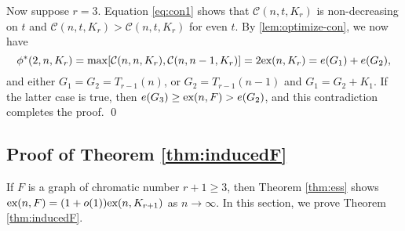 \documentclass[12pt]{article}
\newcommand*{\ex}{\textnormal{ex}}
\newcommand*{\con}{\mathcal{C}}
\begin{document}
  Now suppose $r = 3$. Equation \eqref{eq:con1} shows that $\con(n, t, K_r)$ is non-decreasing on $t$ and $\con(n, t, K_r) > \con(n, t, K_r)$ for even $t$. By \cref{lem:optimize-con}, we now have 
  \[
    \phi^*(2, n, K_r) = \max[\con(n, n, K_r), \con(n, n - 1, K_r)] = 2\ex(n, K_r) = e(G_1) + e(G_2),
  \]
  and either $G_1 = G_2 = T_{r - 1}(n)$, or $G_2 = T_{r - 1}(n - 1)$ and $G_1 = G_2 + K_1$. If the latter case is true, then $e(G_3) \geq \ex(n, F) > e(G_2)$, and this contradiction completes the proof. \qed

\subsection{Proof of Theorem \ref{thm:inducedF}}

If $F$ is a graph of chromatic number $r + 1 \geq 3$, then Theorem \ref{thm:ess} shows 
$\ex(n,F)= (1 + o(1))\ex(n,K_{r+1})$ as $n \rightarrow \infty$. In this section, we prove Theorem \ref{thm:inducedF}.
\end{document}
